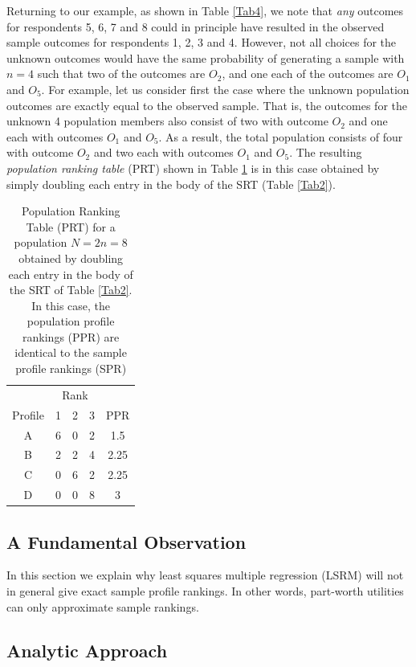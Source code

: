 \documentclass[a4paper, 12pt]{article}
\begin{document}
{\flushleft Returning to our example, as shown in Table \ref{Tab4}, } we note that \emph{any} outcomes for respondents 5, 6,  7 and 8 could in principle have resulted in the observed sample outcomes for respondents 1, 2, 3 and 4.  However, not all choices for the unknown outcomes would have the same probability of generating a sample with $n= 4$ such that  two of the outcomes are $O_2$, and one each of the outcomes are $O_1$ and $O_5$.  For example, let us consider first the case where the unknown population outcomes are exactly equal to the observed sample.  That is, the outcomes for the unknown 4 population members also consist of two with outcome $O_2$ and one each with outcomes $O_1$ and $O_5$. As a result, the total population consists of four with outcome $O_2$ and two each with outcomes $O_1$ and $O_5$. The resulting \emph{population ranking table} (PRT) shown in Table \ref{Tab5} is in this case obtained by simply doubling each entry in the body of the SRT (Table \ref{Tab2}).
\begin{table}[!htpb]
\centering
\scriptsize
\begin{tabular}{c|ccc|c}
&\multicolumn{3}{c}{Rank}&\\
Profile& 1 & 2 & 3&PPR\\\hline
A& 6&0&2&1.5\\
B& 2 &2&4 &2.25\\
C& 0 &6&2&2.25 \\
D& 0 &0&8&3 \\
\end{tabular}
\caption{{\small Population Ranking Table (PRT) for a population $N=2n=8$ obtained by doubling each entry in the body of the SRT of Table \ref{Tab2}. In this case, the population profile rankings (PPR) are identical to the sample profile rankings (SPR)}}
\label{Tab5}
\end{table}

\subsection{A Fundamental Observation}
In this section we explain why  least squares multiple  regression (LSRM) will not in general give exact sample profile rankings. In other words, part-worth utilities can only approximate sample rankings.


\subsection{Analytic Approach}
\end{document}
